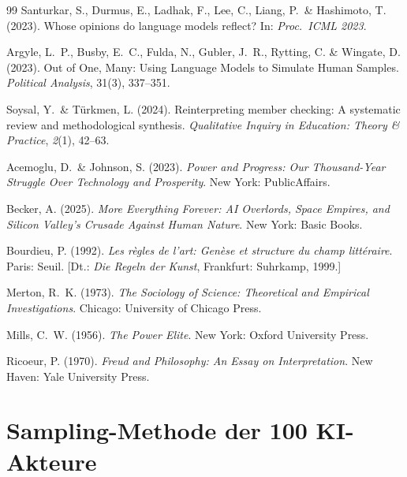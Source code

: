 \documentclass[12pt,a4paper]{article}
\begin{document}
\begin{thebibliography}{99}
  Santurkar, S., Durmus, E., Ladhak, F., Lee, C., Liang, P.~\& Hashimoto, T. (2023).
  Whose opinions do language models reflect?
  In: \textit{Proc.\ ICML 2023}.

  Argyle, L.~P., Busby, E.~C., Fulda, N., Gubler, J.~R., Rytting, C. \& Wingate, D. (2023).
  Out of One, Many: Using Language Models to Simulate Human Samples.
  \textit{Political Analysis}, 31(3), 337--351.

  Soysal, Y.~\& T\"urkmen, L. (2024).
  Reinterpreting member checking: A systematic review and methodological synthesis.
  \textit{Qualitative Inquiry in Education: Theory \& Practice}, \textit{2}(1), 42--63.

  Acemoglu, D.~\& Johnson, S. (2023).
  \textit{Power and Progress: Our Thousand-Year Struggle Over Technology and Prosperity}.
  New York: PublicAffairs.

  Becker, A. (2025).
  \textit{More Everything Forever: AI Overlords, Space Empires, and Silicon Valley's Crusade Against Human Nature}.
  New York: Basic Books.

  Bourdieu, P. (1992).
  \textit{Les r\`egles de l'art: Gen\`ese et structure du champ litt\'eraire}.
  Paris: Seuil.
  [Dt.: \textit{Die Regeln der Kunst}, Frankfurt: Suhrkamp, 1999.]

  Merton, R.~K. (1973).
  \textit{The Sociology of Science: Theoretical and Empirical Investigations}.
  Chicago: University of Chicago Press.

  Mills, C.~W. (1956).
  \textit{The Power Elite}.
  New York: Oxford University Press.

  Ricoeur, P. (1970).
  \textit{Freud and Philosophy: An Essay on Interpretation}.
  New Haven: Yale University Press.

\end{thebibliography}


\newpage
\appendix

\section{Sampling-Methode der 100 KI-Akteure}
\label{app:sampling}
\end{document}
